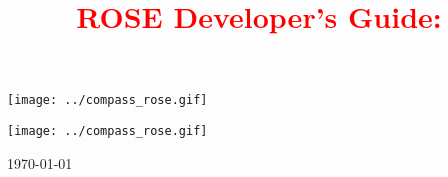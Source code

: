 \documentclass[10pt]{book}
\begin{document}
%
%


\title{ {\bf \textcolor{red}{         ROSE Developer's Guide:  
}}}

\author{ }


\begin{htmlonly}
   \centering \texttt{[image: ../compass\_rose.gif]}
\end{htmlonly}

\maketitle

\begin{htmlonly}
   \centering \texttt{[image: ../compass\_rose.gif]}
\end{htmlonly}

\begin{center}
\today
\end{center}


%



\end{document}
